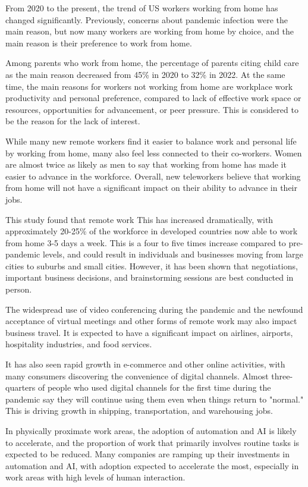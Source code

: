 \documentclass[12pt]{article}
\begin{document}
From 2020 to the present, the trend of US workers working from home has changed
significantly. Previously, concerns about pandemic infection were the main
reason, but now many workers are working from home by choice, and the main
reason is their preference to work from home.

Among parents who work from home, the percentage of parents citing child care
as the main reason decreased from 45\% in 2020 to 32\% in 2022. At the same
time, the main reasons for workers not working from home are workplace work
productivity and personal preference, compared to lack of effective work space
or resources, opportunities for advancement, or peer pressure. This is
considered to be the reason for the lack of interest.

While many new remote workers find it easier to balance work and personal life
by working from home, many also feel less connected to their co-workers. Women
are almost twice as likely as men to say that working from home has made it
easier to advance in the workforce. Overall, new teleworkers believe that
working from home will not have a significant impact on their ability to
advance in their jobs.

This study \cite{future_of_work} found that remote work This has increased
dramatically, with approximately 20-25\% of the workforce in developed
countries now able to work from home 3-5
days a week. This is a four to five times increase compared to pre-pandemic
levels, and could result in individuals and businesses moving from large cities
to suburbs and small cities. However, it has been shown that negotiations,
important business decisions, and brainstorming sessions are best conducted in
person.

The widespread use of video conferencing during the pandemic and the newfound
acceptance of virtual meetings and other forms of remote work may also impact
business travel. It is expected to have a significant impact on airlines,
airports, hospitality industries, and food services.

It has also seen rapid growth in e-commerce and other online activities, with
many consumers discovering the convenience of digital channels. Almost
three-quarters of people who used digital channels for the first time during
the pandemic say they will continue using them even when things return to
"normal." This is driving growth in shipping, transportation, and warehousing
jobs.

In physically proximate work areas, the adoption of automation and AI is likely
to accelerate, and the proportion of work that primarily involves routine tasks
is expected to be reduced. Many companies are ramping up their investments in
automation and AI, with adoption expected to accelerate the most, especially in
work areas with high levels of human interaction.
\end{document}

